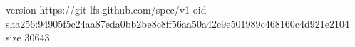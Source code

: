 version https://git-lfs.github.com/spec/v1
oid sha256:94905f5c24aa87eda0bb2be8c8ff56aa50a42c9e501989c468160c4d921e2104
size 30643

